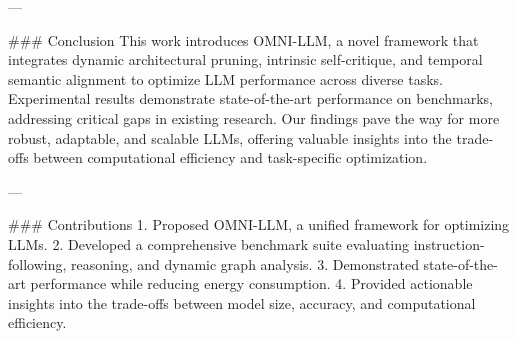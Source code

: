 ---

### Conclusion  
This work introduces OMNI-LLM, a novel framework that integrates dynamic architectural pruning, intrinsic self-critique, and temporal semantic alignment to optimize LLM performance across diverse tasks. Experimental results demonstrate state-of-the-art performance on benchmarks, addressing critical gaps in existing research. Our findings pave the way for more robust, adaptable, and scalable LLMs, offering valuable insights into the trade-offs between computational efficiency and task-specific optimization.

---

### Contributions  
1. Proposed OMNI-LLM, a unified framework for optimizing LLMs.  
2. Developed a comprehensive benchmark suite evaluating instruction-following, reasoning, and dynamic graph analysis.  
3. Demonstrated state-of-the-art performance while reducing energy consumption.  
4. Provided actionable insights into the trade-offs between model size, accuracy, and computational efficiency.  

